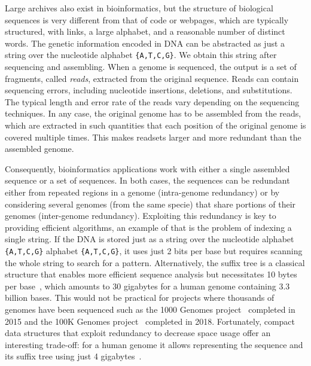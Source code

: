 Large archives also exist in bioinformatics, but the structure of biological sequences is very different from that of code or webpages, which are typically structured, with links, a large alphabet, and a reasonable number of distinct words.
The genetic information encoded in DNA can be abstracted as just a string over the nucleotide alphabet \texttt{\{A,T,C,G\}}.
We obtain this string after sequencing and assembling. When a genome is sequenced, the output is a set of fragments, called \emph{reads}, extracted from the original sequence. Reads can contain sequencing errors, including nucleotide insertions, deletions, and substitutions. The typical length and error rate of the reads vary depending on the sequencing techniques. In any case, the original genome has to be assembled from the reads, which are extracted in such quantities that each position of the original genome is covered multiple times. This makes readsets larger and more redundant than the assembled genome.


Consequently, bioinformatics applications work with either a single assembled sequence or a set of sequences. In both cases, the sequences can be redundant either from repeated regions in a genome (intra-genome redundancy) or by considering several genomes (from the same specie) that share portions of their genomes (inter-genome redundancy).
Exploiting this redundancy is key to providing efficient algorithms, an example of that is the problem of indexing a single string.
If the DNA is stored just as a string over the nucleotide alphabet \texttt{\{A,T,C,G\}}
alphabet \texttt{\{A,T,C,G\}}, it uses just 2 bits per base but requires scanning the whole string to search for a pattern. 
Alternatively, the suffix tree is a classical structure that enables more efficient sequence analysis but necessitates 10 bytes per base~\cite{navarro2016compact}, which amounts to 30 gigabytes for a human genome containing 3.3 billion bases. 
This would not be practical for projects where thousands of genomes have been sequenced such as the 1000 Genomes project~\cite{10002015global} completed in 2015 and the 100K Genomes project~\cite{100Kgenomes} completed in 2018. 
Fortunately, compact data structures that exploit redundancy to decrease space usage offer an interesting trade-off: for a human genome it allows representing the sequence and its suffix tree using just 4 gigabytes~\cite{navarro2016compact}.

